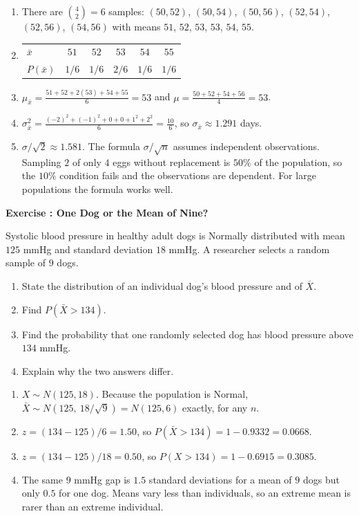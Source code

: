 \documentclass[11pt]{article}
\newcounter{exercise}
\newcommand{\exercise}[1]{%
  \par\medskip
  \refstepcounter{exercise}%
  {\large\bfseries\color{CourseBlue} Exercise \theexercise: #1}\par\smallskip}
\begin{document}
\begin{solution}
\begin{enumerate}
  \item There are $\binom42=6$ samples: $(50,52)$, $(50,54)$, $(50,56)$, $(52,54)$, $(52,56)$, $(54,56)$ with means $51$, $52$, $53$, $53$, $54$, $55$.
  \item
  \begin{tabular}{lccccc}
  \toprule
  $\bar x$ & $51$ & $52$ & $53$ & $54$ & $55$\\
  $P(\bar x)$ & $1/6$ & $1/6$ & $2/6$ & $1/6$ & $1/6$\\
  \bottomrule
  \end{tabular}
  \item $\mu_{\bar x}=\frac{51+52+2(53)+54+55}{6}=53$ and $\mu=\frac{50+52+54+56}{4}=53$.
  \item $\sigma_{\bar x}^2=\frac{(-2)^2+(-1)^2+0+0+1^2+2^2}{6}=\frac{10}{6}$, so $\sigma_{\bar x}\approx1.291$ days.
  \item $\sigma/\sqrt2\approx1.581$. The formula $\sigma/\sqrt n$ assumes independent observations. Sampling $2$ of only $4$ eggs without replacement is $50\%$ of the population, so the $10\%$ condition fails and the observations are dependent. For large populations the formula works well.
\end{enumerate}
\end{solution}

\exercise{One Dog or the Mean of Nine?}

Systolic blood pressure in healthy adult dogs is Normally distributed with mean $125$ mmHg and standard deviation $18$ mmHg. A researcher selects a random sample of $9$ dogs.

\begin{enumerate}
  \item State the distribution of an individual dog's blood pressure and of $\bar X$.
  \item Find $P(\bar X>134)$.
  \item Find the probability that one randomly selected dog has blood pressure above $134$ mmHg.
  \item Explain why the two answers differ.
\end{enumerate}

\begin{solution}
\begin{enumerate}
  \item $X\sim N(125,18)$. Because the population is Normal, $\bar X\sim N(125,\ 18/\sqrt9)=N(125,6)$ exactly, for any $n$.
  \item $z=(134-125)/6=1.50$, so $P(\bar X>134)=1-0.9332=0.0668$.
  \item $z=(134-125)/18=0.50$, so $P(X>134)=1-0.6915=0.3085$.
  \item The same $9$ mmHg gap is $1.5$ standard deviations for a mean of $9$ dogs but only $0.5$ for one dog. Means vary less than individuals, so an extreme mean is rarer than an extreme individual.
\end{enumerate}
\end{solution}
\end{document}
